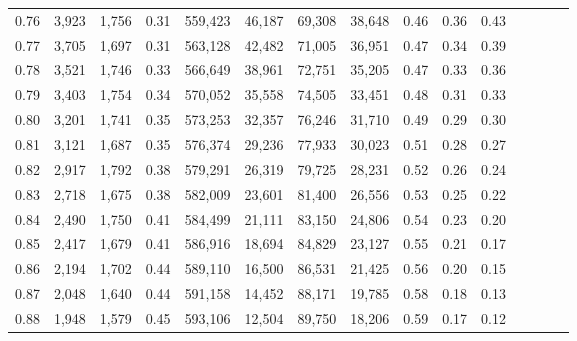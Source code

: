 \begin{tabular}{rrrcrrrrrrrrrrr}
0.76 &  3,923 &  1,756 &                                       0.31 &  559,423 &   46,187 &   69,308 &   38,648 &  0.46 &  0.36 &                         0.43 \\
0.77 &  3,705 &  1,697 &                                       0.31 &  563,128 &   42,482 &   71,005 &   36,951 &  0.47 &  0.34 &                         0.39 \\
0.78 &  3,521 &  1,746 &                                       0.33 &  566,649 &   38,961 &   72,751 &   35,205 &  0.47 &  0.33 &                         0.36 \\
0.79 &  3,403 &  1,754 &                                       0.34 &  570,052 &   35,558 &   74,505 &   33,451 &  0.48 &  0.31 &                         0.33 \\
0.80 &  3,201 &  1,741 &                                       0.35 &  573,253 &   32,357 &   76,246 &   31,710 &  0.49 &  0.29 &                         0.30 \\
0.81 &  3,121 &  1,687 &                                       0.35 &  576,374 &   29,236 &   77,933 &   30,023 &  0.51 &  0.28 &                         0.27 \\
0.82 &  2,917 &  1,792 &                                       0.38 &  579,291 &   26,319 &   79,725 &   28,231 &  0.52 &  0.26 &                         0.24 \\
0.83 &  2,718 &  1,675 &                                       0.38 &  582,009 &   23,601 &   81,400 &   26,556 &  0.53 &  0.25 &                         0.22 \\
0.84 &  2,490 &  1,750 &                                       0.41 &  584,499 &   21,111 &   83,150 &   24,806 &  0.54 &  0.23 &                         0.20 \\
0.85 &  2,417 &  1,679 &                                       0.41 &  586,916 &   18,694 &   84,829 &   23,127 &  0.55 &  0.21 &                         0.17 \\
0.86 &  2,194 &  1,702 &                                       0.44 &  589,110 &   16,500 &   86,531 &   21,425 &  0.56 &  0.20 &                         0.15 \\
0.87 &  2,048 &  1,640 &                                       0.44 &  591,158 &   14,452 &   88,171 &   19,785 &  0.58 &  0.18 &                         0.13 \\
0.88 &  1,948 &  1,579 &                                       0.45 &  593,106 &   12,504 &   89,750 &   18,206 &  0.59 &  0.17 &                         0.12 \\

\end{tabular}
